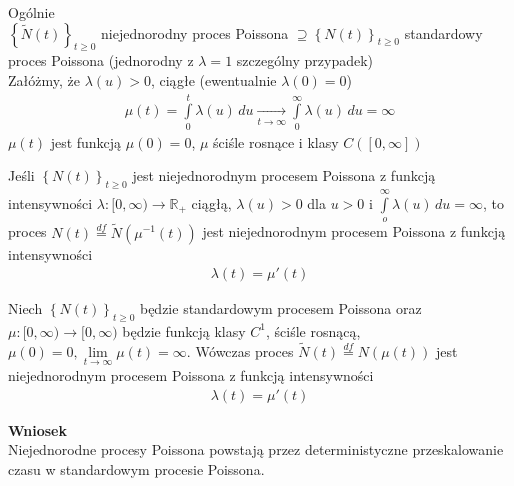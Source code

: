 Ogólnie\\
$ \left\{\tilde{N}(t)\right\}_{t\ge 0} $ niejednorodny proces Poissona $ \supseteq\left\{N(t)\right\}_{t\ge 0} $ standardowy proces Poissona (jednorodny z $ \lambda=1 $ {\small szczególny przypadek})\\
Załóżmy, że $ \lambda(u)>0 $, ciągłe (ewentualnie $ \lambda(0)=0 $)
\begin{gather*}
\mu(t)=\int\limits_{0}^{t}\lambda(u)\,du
\xrightarrow[t\to\infty ]{}
\int\limits_{0}^{\infty }\lambda(u)\,du=\infty 
\end{gather*}
$ \mu(t) $ jest funkcją $ \mu(0)=0 $, $ \mu $ ściśle rosnące i klasy $ C\left([0,\infty ]\right) $
\begin{twr}
Jeśli $ \left\{N(t)\right\}_{t\ge 0} $ jest niejednorodnym procesem Poissona z funkcją intensywności $ \lambda:[0,\infty )\to \mathbb R _+ $ ciągłą, $ \lambda(u)>0 $ dla $ u>0 $ i $ \int\limits_{o}^{\infty }\lambda(u)\,du=\infty  $, to proces $ N(t)\stackrel{df}{=}\tilde{N}(\mu^{-1}(t)) $ jest niejednorodnym procesem Poissona z funkcją intensywności
\begin{gather*}
\lambda(t)=\mu'(t)
\end{gather*}
\end{twr}
\begin{twr}
Niech $ \left\{N(t)\right\}_{t\ge 0} $ będzie standardowym procesem Poissona oraz $ \mu:[0,\infty )\to[0,\infty ) $ będzie funkcją klasy $ C^1 $, ściśle rosnącą, $ \mu(0)=0,\lim\limits_{t\to\infty} \mu(t)=\infty  $. Wówczas proces $ \tilde{N}(t)\stackrel{df}{=}N\left(\mu(t)\right) $ jest niejednorodnym procesem Poissona z funkcją intensywności
\begin{gather*}
\lambda(t)=\mu'(t)
\end{gather*}
\end{twr}
\textbf{Wniosek}\\
Niejednorodne procesy Poissona powstają przez deterministyczne przeskalowanie czasu w standardowym procesie Poissona.


